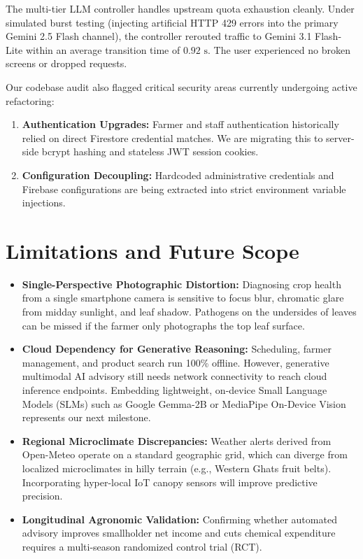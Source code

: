 \documentclass[conference]{IEEEtran}
\begin{document}
The multi-tier LLM controller handles upstream quota exhaustion cleanly. Under simulated burst testing (injecting artificial HTTP 429 errors into the primary Gemini 2.5 Flash channel), the controller rerouted traffic to Gemini 3.1 Flash-Lite within an average transition time of $0.92\text{ s}$. The user experienced no broken screens or dropped requests.

Our codebase audit also flagged critical security areas currently undergoing active refactoring:
\begin{enumerate}
    \item \textbf{Authentication Upgrades:} Farmer and staff authentication historically relied on direct Firestore credential matches. We are migrating this to server-side bcrypt hashing and stateless JWT session cookies.
    \item \textbf{Configuration Decoupling:} Hardcoded administrative credentials and Firebase configurations are being extracted into strict environment variable injections.
\end{enumerate}

\section{Limitations and Future Scope}
\begin{itemize}
    \item \textbf{Single-Perspective Photographic Distortion:} Diagnosing crop health from a single smartphone camera is sensitive to focus blur, chromatic glare from midday sunlight, and leaf shadow. Pathogens on the undersides of leaves can be missed if the farmer only photographs the top leaf surface.
    \item \textbf{Cloud Dependency for Generative Reasoning:} Scheduling, farmer management, and product search run 100\% offline. However, generative multimodal AI advisory still needs network connectivity to reach cloud inference endpoints. Embedding lightweight, on-device Small Language Models (SLMs) such as Google Gemma-2B or MediaPipe On-Device Vision represents our next milestone.
    \item \textbf{Regional Microclimate Discrepancies:} Weather alerts derived from Open-Meteo operate on a standard geographic grid, which can diverge from localized microclimates in hilly terrain (e.g., Western Ghats fruit belts). Incorporating hyper-local IoT canopy sensors will improve predictive precision.
    \item \textbf{Longitudinal Agronomic Validation:} Confirming whether automated advisory improves smallholder net income and cuts chemical expenditure requires a multi-season randomized control trial (RCT).
\end{itemize}
\end{document}
